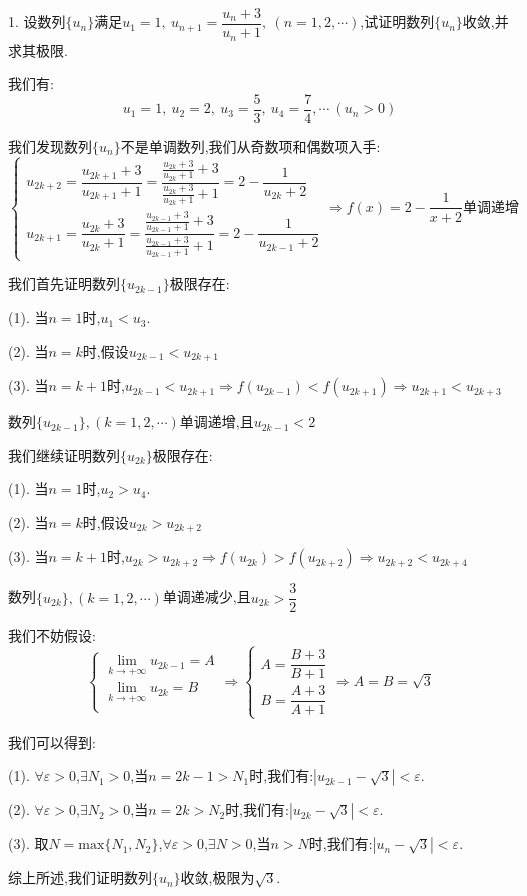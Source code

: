 1. 设数列$\{u_{n}\}$满足$u_{1}=1,\ u_{n+1}=\dfrac{u_{n}+3}{u_{n}+1},\ (n=1,2,\cdots)$,试证明数列$\{u_{n}\}$收敛,并求其极限.
\begin{solution}

	我们有:
	$$u_{1}=1,\ u_{2}=2,\ u_{3}=\dfrac{5}{3},\ u_{4}=\dfrac{7}{4},\cdots\ (u_{n}>0)$$
	
	我们发现数列$\{u_{n}\}$不是单调数列,我们从奇数项和偶数项入手:
	$$\left\lbrace
	\begin{array}{l}
		u_{2k+2}=\dfrac{u_{2k+1}+3}{u_{2k+1}+1}=\dfrac{\frac{u_{2k}+3}{u_{2k}+1}+3}{\frac{u_{2k}+3}{u_{2k}+1}+1}=2-\dfrac{1}{u_{2k}+2}\\
		u_{2k+1}=\dfrac{u_{2k}+3}{u_{2k}+1}=\dfrac{\frac{u_{2k-1}+3}{u_{2k-1}+1}+3}{\frac{u_{2k-1}+3}{u_{2k-1}+1}+1}=2-\dfrac{1}{u_{2k-1}+2}
	\end{array}
	\right. \Rightarrow f(x)=2-\dfrac{1}{x+2}\text{单调递增}$$
	
	我们首先证明数列$\{u_{2k-1}\}$极限存在:  
	
	(1). 当$n=1$时,$u_{1}<u_{3}$.
	
	(2). 当$n=k$时,假设$u_{2k-1}<u_{2k+1}$
	
	(3). 当$n=k+1$时,$u_{2k-1}<u_{2k+1}\Rightarrow f(u_{2k-1})<f(u_{2k+1})\Rightarrow u_{2k+1}<u_{2k+3}$
	
	数列$\{u_{2k-1}\},(k=1,2,\cdots)$单调递增,且$u_{2k-1}<2$
	
	我们继续证明数列$\{u_{2k}\}$极限存在:  
	
	(1). 当$n=1$时,$u_{2}>u_{4}$.
	
	(2). 当$n=k$时,假设$u_{2k}>u_{2k+2}$
	
	(3). 当$n=k+1$时,$u_{2k}>u_{2k+2}\Rightarrow f(u_{2k})>f(u_{2k+2})\Rightarrow u_{2k+2}<u_{2k+4}$
	
	数列$\{u_{2k}\},(k=1,2,\cdots)$单调递减少,且$u_{2k}>\dfrac{3}{2}$
	
	我们不妨假设:  $$\left\lbrace
	\begin{array}{l}
		\lim\limits_{k\rightarrow +\infty}u_{2k-1}=A\\
		\lim\limits_{k\rightarrow +\infty}u_{2k}=B\\
	\end{array}
	\right. \Rightarrow \left\lbrace
	\begin{array}{l}
		A=\dfrac{B+3}{B+1}\\
		B=\dfrac{A+3}{A+1}
	\end{array}
	\right. \Rightarrow A=B=\sqrt{3}$$
	
	我们可以得到:  
	
	(1). $\forall \varepsilon>0$,$\exists N_{1}>0$,当$n=2k-1>N_{1}$时,我们有:$|u_{2k-1}-\sqrt{3}|<\varepsilon$.
	
	(2). $\forall \varepsilon>0$,$\exists N_{2}>0$,当$n=2k>N_{2}$时,我们有:$|u_{2k}-\sqrt{3}|<\varepsilon$.
	
	(3). 取$N=\text{max}\{N_{1},N_{2}\}$,$\forall \varepsilon>0$,$\exists N>0$,当$n>N$时,我们有:$|u_{n}-\sqrt{3}|<\varepsilon$.
	
	综上所述,我们证明数列$\{u_{n}\}$收敛,极限为$\sqrt{3}$.
\end{solution}

